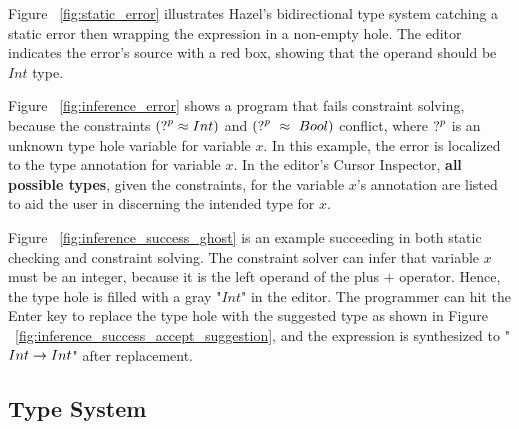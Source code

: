 \par Figure ~\ref{fig:static_error} illustrates Hazel's bidirectional type system catching a static error then wrapping the expression in a non-empty hole. The editor indicates the error's source with a red box, showing that the operand should be $Int$ type. \par

Figure ~\ref{fig:inference_error} shows a program that fails constraint solving, because the constraints $(\mathtt{?}^p \approx Int)$ and $(\mathtt{?}^p ~ \approx ~ Bool)$ conflict, where $\mathtt{?}^p$ is an unknown type hole variable for variable $x$. In this example, the error is localized to the type annotation for variable $x$. In the editor's Cursor Inspector, \textbf{all possible types}, given the constraints, for the variable $x$'s annotation are listed to aid the user in discerning the intended type for $x$.

Figure ~\ref{fig:inference_success_ghost} is an example succeeding in both static checking and constraint solving.  The constraint solver can infer that variable $x$ must be an integer, because it is the left operand of the plus $+$ operator. Hence, the type hole is filled with a gray "$Int$" in the editor. The programmer can hit the Enter key to replace the type hole with the suggested type as shown in Figure ~\ref{fig:inference_success_accept_suggestion}, and the expression is synthesized to "$Int \rightarrow Int$" after replacement. \par


\subsection{Type System}

